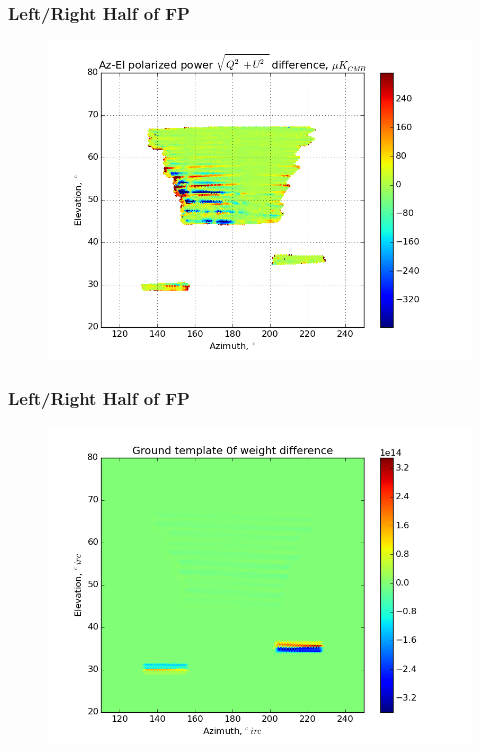 \documentclass{beamer}
\begin{document}
\begin{frame}
\frametitle{Left/Right Half of FP}
\begin{figure}
\includegraphics[width=0.9\linewidth]{dMag_gt_LHS_RHS.png}
\end{figure}
\end{frame}

\begin{frame}
\frametitle{Left/Right Half of FP}
\begin{figure}
\includegraphics[width=0.9\linewidth]{dw0_gt_LHS_RHS.png}
\end{figure}
\end{frame}
\end{document}
